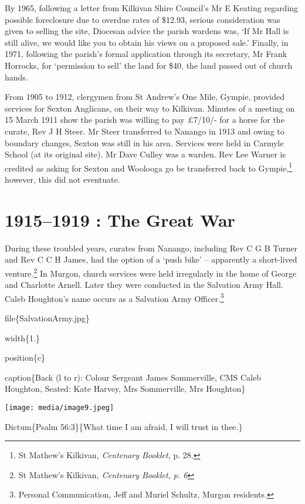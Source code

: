 By 1965, following a letter from Kilkivan Shire Council's Mr E Keating regarding possible foreclosure due to overdue rates of \$12.93, serious consideration was given to selling the site, Diocesan advice the parish wardens was, `If Mr Hall is still alive, we would like you to obtain his views on a proposed sale.' Finally, in 1971, following the parish's formal application through its secretary, Mr Frank Horrocks, for `permission to sell' the land for \$40, the land passed out of church hands.

From 1905 to 1912, clergymen from St Andrew's One Mile, Gympie, provided services for Sexton Anglicans, on their way to Kilkivan. Minutes of a meeting on 15 March 1911 show the parish was willing to pay £7/10/- for a horse for the curate, Rev J H Steer. Mr Steer transferred to Nanango in 1913 and owing to boundary changes, Sexton was still in his area. Services were held in Carmyle School (at its original site). Mr Dave Culley was a warden. Rev Lee Warner is credited as asking for Sexton and Woolooga go be transferred back to Gympie,\footnote{St Mathew's Kilkivan\emph{, Centenary Booklet,} p. 28.} however, this did not eventuate.

\hypertarget{the-great-war}{%
\section{1915--1919 : The Great War}\label{the-great-war}}

During these troubled years, curates from Nanango, including Rev C G B Turner and Rev C C H James\emph{,} had the option of a `push bike' -- apparently a short-lived venture.\footnote{St Mathew's Kilkivan\emph{, Centenary Booklet, p. 6}} In Murgon, church services were held irregularly in the home of George and Charlotte Arnell. Later they were conducted in the Salvation Army Hall. Caleb Houghton's name occurs as a Salvation Army Officer.\footnote{Personal Communication, Jeff and Muriel Schultz, Murgon residents.}

file\{SalvationArmy.jpg\}

width\{1.\}

position\{c\}

caption\{Back (l to r): Colour Sergeant James Sommerville, CMS Caleb Houghton, Seated: Kate Harvey, Mrs Sommerville, Mrs Houghton\}

\texttt{[image: media/image9.jpeg]}

Dictum\{Psalm 56:3\}\{What time I am afraid, I will trust in thee.\}

